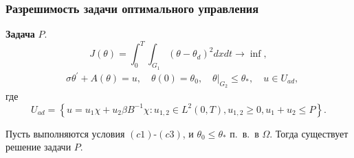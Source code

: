 \begin{frame}
    \frametitle{Разрешимость задачи оптимального управления}

    \textbf{Задача} $P$.
    \[
        J(\theta)=\int_{0}^{T}
        \int_{G_{1}}\left(\theta-\theta_{d}\right)^{2} d x d t \rightarrow \inf,
    \]
    \[
        \begin{aligned}
            & \sigma \theta^{\prime}+A(\theta)=u,
            \quad \theta(0)=\theta_{0},\left.\quad
            \theta\right|_{G_{2}} \leq \theta_{*},
            \quad u \in U_{a d},
        \end{aligned}
    \]
    где
    \[
        U_{a d}=\left\{u=u_{1} \chi+u_{2} \beta B^{-1}
        \chi: u_{1,2} \in L^{2}(0, T),\right.
        \left.u_{1,2} \geq 0, u_{1}+u_{2} \leq P\right\}.
    \]
    \begin{theorem}[3.1]
        \label{th:3_2:1}
        Пусть выполняются условия $(c1)$-$(c3)$, и $\theta_{0} \leq \theta_{*}$ п.\ в.\ в $\Omega$.
        Тогда существует решение задачи $P$.
    \end{theorem}
\end{frame}


